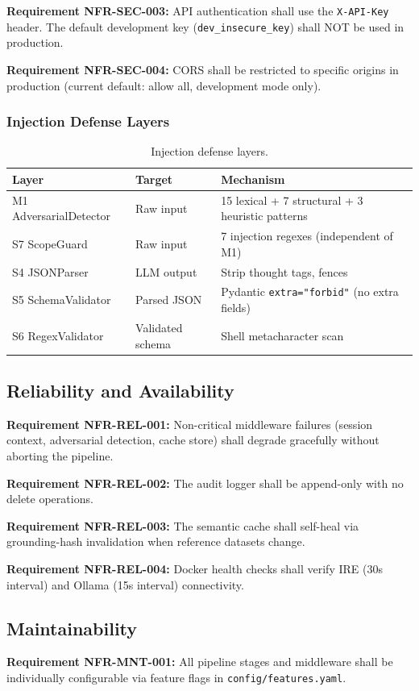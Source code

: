 ﻿\documentclass[10pt,journal,onecolumn]{IEEEtran}
\newcommand{\reqid}[1]{\textbf{#1}}
\begin{document}
\reqid{Requirement NFR-SEC-003:} API authentication shall use the \texttt{X-API-Key} header. The default development key (\texttt{dev\_insecure\_key}) shall NOT be used in production.

\reqid{Requirement NFR-SEC-004:} CORS shall be restricted to specific origins in production (current default: allow all, development mode only).

\subsubsection{Injection Defense Layers}
\begin{table}[h]
\caption{Injection defense layers.}
\label{tab:defense}
\begin{tabularx}{\columnwidth}{l >{\raggedright\arraybackslash}p{} X}
\toprule
\textbf{Layer} & \textbf{Target} & \textbf{Mechanism}\\
\midrule
M1 AdversarialDetector & Raw input & 15 lexical + 7 structural + 3 heuristic patterns\\
S7 ScopeGuard & Raw input & 7 injection regexes (independent of M1)\\
S4 JSONParser & LLM output & Strip thought tags, fences\\
S5 SchemaValidator & Parsed JSON & Pydantic \texttt{extra="forbid"} (no extra fields)\\
S6 RegexValidator & Validated schema & Shell metacharacter scan\\
\bottomrule
\end{tabularx}
\end{table}

\subsection{Reliability and Availability}
\reqid{Requirement NFR-REL-001:} Non-critical middleware failures (session context, adversarial detection, cache store) shall degrade gracefully without aborting the pipeline.

\reqid{Requirement NFR-REL-002:} The audit logger shall be append-only with no delete operations.

\reqid{Requirement NFR-REL-003:} The semantic cache shall self-heal via grounding-hash invalidation when reference datasets change.

\reqid{Requirement NFR-REL-004:} Docker health checks shall verify IRE (30s interval) and Ollama (15s interval) connectivity.

\subsection{Maintainability}
\reqid{Requirement NFR-MNT-001:} All pipeline stages and middleware shall be individually configurable via feature flags in \texttt{config/features.yaml}.
\end{document}
